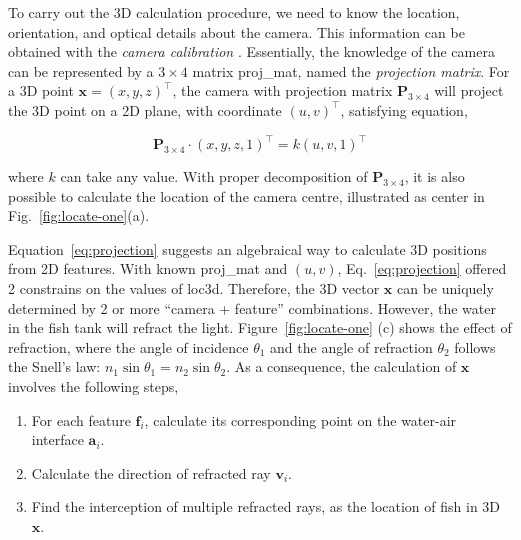 \documentclass[11pt,twoside]{report}
\begin{document}
To carry out the 3D calculation procedure, we need to know the location, orientation, and optical details about the camera. This information can be obtained with the \emph{camera calibration} \cite{zhang2000, hartley2003}.
Essentially, the knowledge of the camera can be represented by a $3 \times 4$ matrix \gls{proj_mat}, named the \emph{projection matrix}. For a 3D point $\mathbf{x} = (x, y, z)^\top$, the camera with projection matrix $\mathbf{P}_{3 \times 4}$ will project the 3D point on a 2D plane, with coordinate $(u, v)^\top$, satisfying  equation,

\begin{equation}
	\mathbf{P}_{3 \times 4}
	\cdot (x, y, z, 1)^\top = k (u, v, 1)^\top
\label{eq:projection}
\end{equation}

\noindent where $k$ can take any value.
With proper decomposition of $\mathbf{P}_{3 \times 4}$, it is also possible to calculate the location of the camera centre, illustrated as \gls{center} in Fig.~\ref{fig:locate-one}(a).

 Equation~\ref{eq:projection} suggests an algebraical way to calculate 3D positions from 2D features. With known \gls{proj_mat} and $(u, v)$, Eq.~\ref{eq:projection} offered 2 constrains on the values of \gls{loc3d}. Therefore, the 3D vector $\mathbf{x}$ can be uniquely determined by 2 or more ``camera + feature'' combinations. However, the water in the fish tank will refract the light. Figure~\ref{fig:locate-one} (c) shows the effect of refraction, where the angle of incidence $\theta_1$ and the angle of refraction $\theta_2$ follows the Snell's law: $n_1 \sin\theta_1 = n_2 \sin\theta_2$. As a consequence, the calculation of $\mathbf{x}$ involves the following steps,
 
 \begin{enumerate}
 	\item For each feature $\mathbf{f}_i$, calculate its corresponding point on the water-air interface $\mathbf{a}_i$.
 	\item Calculate the direction of refracted ray $\mathbf{v}_i$.
 	\item Find the interception of multiple refracted rays, as the location of fish in 3D $\mathbf{x}$.
 \end{enumerate}
\end{document}
